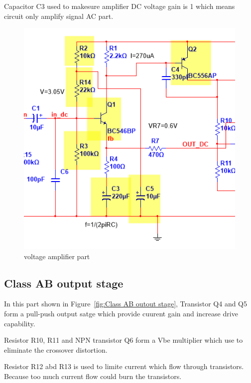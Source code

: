 Capacitor C3 used to makesure amplifier DC voltage gain is 1 which means circuit only amplify signal AC part.

\begin{figure}[htbp]
	\centering
	\includegraphics[scale=0.8]{"../Photo/Chap5/voltage amplifier part"}
	\caption{voltage amplifier part }
	\label{fig:voltage amplifier part}
\end{figure}

\subsection{Class AB output stage}  

In this part shown in Figure~\ref{fig:Class AB outout stage}, Transistor Q4 and Q5 form a pull-push output satge which provide cuurent gain and increase drive capability.

Resistor R10, R11 and NPN transistor Q6 form a Vbe multiplier which use to eliminate the crossover distortion.

Resistor R12 abd R13 is used to limite current which flow through transistors. Because too much current flow could burn the transistors.


